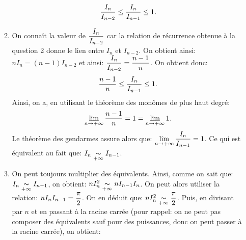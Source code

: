 \documentclass[a4paper, 11pt,reqno]{article}
\begin{document}
\begin{correction}
\begin{enumerate}
\begin{enumerate}
			            $$\displaystyle\frac{I_n}{I_{n-2}}\leq \displaystyle\frac{I_n}{I_{n-1}} \leq 1.$$
			      \item On conna\^it la valeur de $\displaystyle\frac{I_n}{I_{n-2}}$ car la relation de r\'ecurrence obtenue \`a la question 2 donne le lien entre $I_n$ et $I_{n-2}$. On obtient ainsi: $nI_n=(n-1)I_{n-2}$ et ainsi: $\displaystyle\frac{I_n}{I_{n-2}} = \displaystyle\frac{n-1}{n}$. On obtient donc:
			            $$ \displaystyle\frac{n-1}{n} \leq \displaystyle\frac{I_n}{I_{n-1}} \leq 1.$$
			            Ainsi, on a, en utilisant le th\'eor\`eme des mon\^omes de plus haut degr\'e:
			            $$\lim\limits_{n\to +\infty} \displaystyle\frac{n-1}{n}=1=\lim\limits_{n\to +\infty} 1.$$
			            Le th\'eor\`eme des gendarmes assure alors que: $\lim\limits_{n\to + \infty} \displaystyle\frac{I_n}{I_{n-1}}=1$. Ce qui est \'equivalent au fait que: $I_n\underset{+\infty}{\thicksim} I_{n-1}$.
			      \item On peut toujours multiplier des \'equivalents. Ainsi, comme on sait que: $I_n\underset{+\infty}{\thicksim} I_{n-1}$, on obtient: $nI_n^2\underset{+\infty}{\thicksim} nI_{n-1}I_n$. On peut alors utiliser la relation: $nI_nI_{n-1}=\displaystyle\frac{\pi}{2}$. On en d\'eduit que: $nI_n^2\underset{+\infty}{\thicksim} \displaystyle\frac{\pi}{2}$. Puis, en divisant par $n$ et en passant \`a la racine carr\'ee (pour rappel: on ne peut pas composer des \'equivalents sauf pour des puissances, donc on peut passer \`a la racine carr\'ee), on obtient:
		      \end{enumerate}

\end{enumerate}
\end{correction}
\end{document}
